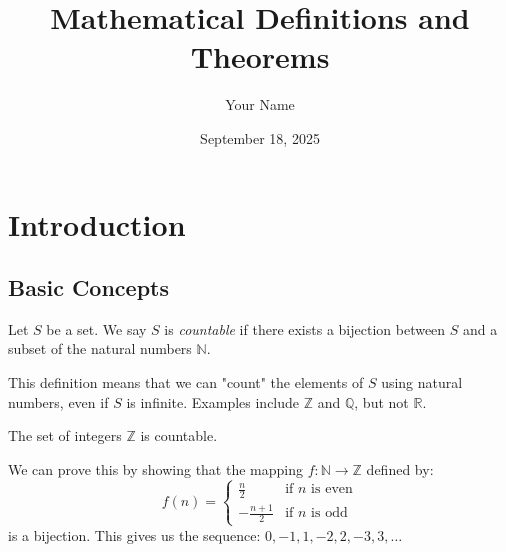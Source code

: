 \documentclass[12pt]{book}
\author{Your Name}
\date{September 18, 2025}
\title{Mathematical Definitions and Theorems}
\newcommand{\R}{\mathbb{R}}
\newcommand{\Z}{\mathbb{Z}}
\newcommand{\btheorem}{\begin{theorem}{}}
\newcommand{\etheorem}{\end{theorem}}
\newcommand{\bdefn}{\begin{definition}{}}
\newcommand{\edefn}{\end{definition}}
\newcommand{\bexpl}{\begin{explanation}}
\newcommand{\eexpl}{\end{explanation}}
\begin{document}
\maketitle

\chapter{Introduction}
\section{Basic Concepts}

\bdefn
Let $S$ be a set. We say $S$ is \emph{countable} if there exists a bijection between $S$ and a subset of the natural numbers $\mathbb{N}$.
\edefn

\bexpl
This definition means that we can "count" the elements of $S$ using natural numbers, even if $S$ is infinite. Examples include $\Z$ and $\mathbb{Q}$, but not $\R$.
\eexpl

\btheorem
The set of integers $\Z$ is countable.
\etheorem

\bexpl
We can prove this by showing that the mapping $f: \mathbb{N} \to \Z$ defined by:
$$f(n) = \begin{cases} 
\frac{n}{2} & \text{if } n \text{ is even} \\
-\frac{n+1}{2} & \text{if } n \text{ is odd}
\end{cases}$$
is a bijection. This gives us the sequence: $0, -1, 1, -2, 2, -3, 3, \ldots$
\eexpl
\end{document}
